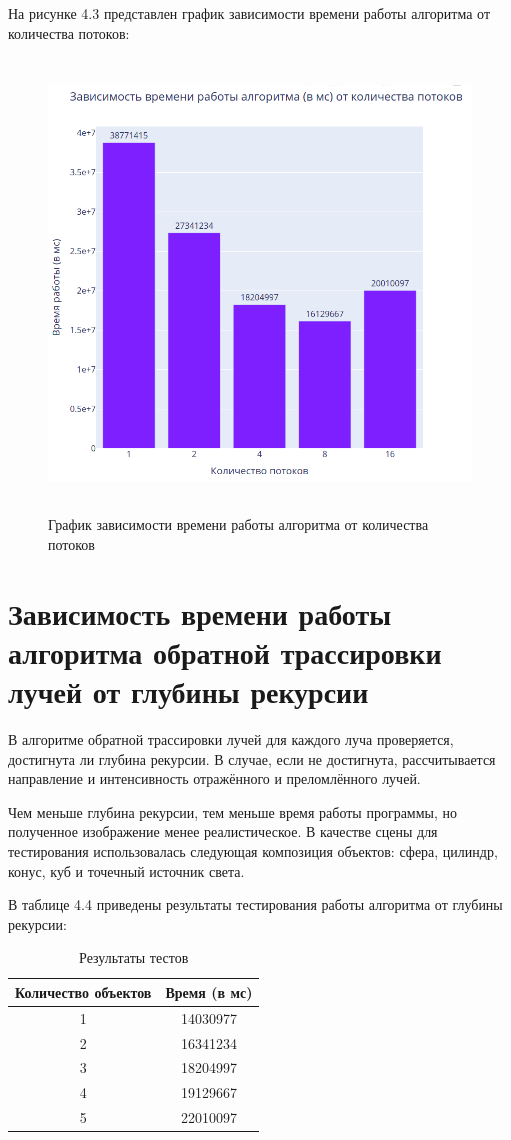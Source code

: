 На рисунке 4.3 представлен график зависимости времени работы алгоритма от количества потоков:
\FloatBarrier
\begin{figure}[h]
	\begin{center}
		\includegraphics[height = 12cm, width=14cm]{inc/thread.png}
	\end{center}
	\caption{График зависимости времени работы алгоритма от количества потоков}
\end{figure}
\FloatBarrier

\section{Зависимость времени работы алгоритма обратной трассировки лучей от глубины рекурсии}
В алгоритме обратной трассировки лучей для каждого луча проверяется, достигнута ли глубина рекурсии.
В случае, если не достигнута, рассчитывается направление и интенсивность отражённого и преломлённого лучей.

Чем меньше глубина рекурсии, тем меньше время работы программы, но полученное изображение менее реалистическое.
В качестве сцены для тестирования использовалась следующая композиция объектов: сфера, цилиндр, конус, куб и точечный источник света.

В таблице 4.4 приведены результаты тестирования работы алгоритма от глубины рекурсии:
\FloatBarrier
\begin{table}[h]
	\caption{Результаты тестов}
	\centering
	\begin{tabular}{ | c | c |}
		\hline
		Количество объектов & Время (в мс) \\ 
		\hline
		1 & 14030977 \\
		2 & 16341234 \\
		3 & 18204997 \\
		4 & 19129667 \\
		5 & 22010097\\
		\hline
	\end{tabular}
\end{table}
\FloatBarrier


